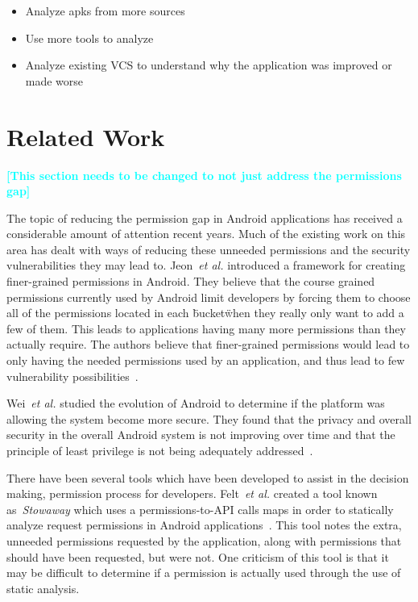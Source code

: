 \documentclass{sig-alternate}
\newcommand{\todo}[1]{\textcolor{cyan}{\textbf{[#1]}}}
\begin{document}
\begin{itemize}
  \item Analyze apks from more sources
  \item Use more tools to analyze
  \item  Analyze existing VCS to understand why the application was improved or made worse
\end{itemize}




\section{Related Work}
\label{sec: relatedwork}

\todo{This section needs to be changed to not just address the permissions gap}

The topic of reducing the permission gap in Android applications has received a considerable amount of attention recent years. Much of the existing work on this area has dealt with ways of reducing these unneeded permissions and the security vulnerabilities they may lead to. Jeon~\emph{et al.} introduced a framework for creating finer-grained permissions in Android. They believe that the course grained permissions currently used by Android limit developers by forcing them to choose all of the permissions located in each \"bucket\" when they really only want to add a few of them. This leads to applications having many more permissions than they actually require. The authors believe that finer-grained permissions would lead to only having the needed permissions used by an application, and thus lead to few vulnerability possibilities~\cite{jeon2011dr}.


Wei~\emph{et al.} studied the evolution of Android to determine if the platform was allowing the system become more secure. They found that the privacy and overall security in the overall Android system is not improving over time and that the principle of least privilege is not being adequately addressed~\cite{Wei:2012:PEA:2420950.2420956}. %


There have been several tools which have been developed to assist in the decision making, permission process for developers. Felt~\emph{et al.} created a tool known as~\emph{Stowaway} which uses a permissions-to-API calls maps in order to statically analyze request permissions in Android applications~\cite{Felt:2011:APD:2046707.2046779}. This tool notes the extra, unneeded permissions requested by the application, along with permissions that should have been requested, but were not. One criticism of this tool is that it may be difficult to determine if a permission is actually used through the use of static analysis.
\end{document}
